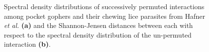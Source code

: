 \begin{figure}
    \centering
    \caption{Spectral density distributions of successively permuted interactions among pocket gophers and their chewing lice parasites from Hafner {\em et al.} \cite{hafner1994disparate} \textbf{(a)} and the Shannon-Jensen distances between each with respect to the spectral density distribution of the un-permuted interaction \textbf{(b)}.}
    \label{fig:FP_permuted_distances}
\end{figure}